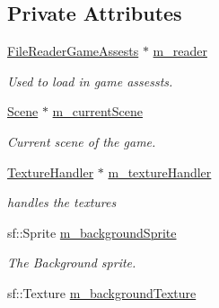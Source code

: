 \subsection*{Private Attributes}
\begin{DoxyCompactItemize}
\item 
\mbox{\label{class_game_one_a5072e2a0c8f6161dd2f34a8ad643760e}} 
\mbox{\hyperlink{class_file_reader_game_assests}{File\+Reader\+Game\+Assests}} $\ast$ \mbox{\hyperlink{class_game_one_a5072e2a0c8f6161dd2f34a8ad643760e}{m\+\_\+reader}}
\begin{DoxyCompactList}\small\item\em Used to load in game assessts. \end{DoxyCompactList}\item 
\mbox{\label{class_game_one_a8e393ac3370d069b3996f56a8c47ff33}} 
\mbox{\hyperlink{class_scene}{Scene}} $\ast$ \mbox{\hyperlink{class_game_one_a8e393ac3370d069b3996f56a8c47ff33}{m\+\_\+current\+Scene}}
\begin{DoxyCompactList}\small\item\em Current scene of the game. \end{DoxyCompactList}\item 
\mbox{\label{class_game_one_ac12bf28dc852ca8ef0628ba98d7d3a4e}} 
\mbox{\hyperlink{class_texture_handler}{Texture\+Handler}} $\ast$ \mbox{\hyperlink{class_game_one_ac12bf28dc852ca8ef0628ba98d7d3a4e}{m\+\_\+texture\+Handler}}
\begin{DoxyCompactList}\small\item\em handles the textures \end{DoxyCompactList}\item 
\mbox{\label{class_game_one_a810562b54953c069d2e1dbc64d8f5421}} 
sf\+::\+Sprite \mbox{\hyperlink{class_game_one_a810562b54953c069d2e1dbc64d8f5421}{m\+\_\+background\+Sprite}}
\begin{DoxyCompactList}\small\item\em The Background sprite. \end{DoxyCompactList}\item 
\mbox{\label{class_game_one_a983b97428e90b5e77947b5dca0b3f59a}} 
sf\+::\+Texture \mbox{\hyperlink{class_game_one_a983b97428e90b5e77947b5dca0b3f59a}{m\+\_\+background\+Texture}}

\end{DoxyCompactItemize}
